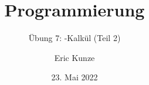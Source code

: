 \documentclass{beamer}
\begin{document}
	
	\title{Programmierung}
	\subtitle{Übung 7: \textlambda-Kalkül (Teil 2)}
	\author{Eric Kunze}
	\date{23. Mai 2022}
	
	\maketitle
	


\end{document}
